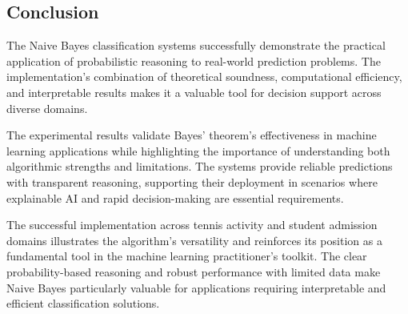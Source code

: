 \documentclass[11pt,a4paper]{article}
\begin{document}
\subsection{Conclusion}

The Naive Bayes classification systems successfully demonstrate the practical application of probabilistic reasoning to real-world prediction problems. The implementation's combination of theoretical soundness, computational efficiency, and interpretable results makes it a valuable tool for decision support across diverse domains.

The experimental results validate Bayes' theorem's effectiveness in machine learning applications while highlighting the importance of understanding both algorithmic strengths and limitations. The systems provide reliable predictions with transparent reasoning, supporting their deployment in scenarios where explainable AI and rapid decision-making are essential requirements.

The successful implementation across tennis activity and student admission domains illustrates the algorithm's versatility and reinforces its position as a fundamental tool in the machine learning practitioner's toolkit. The clear probability-based reasoning and robust performance with limited data make Naive Bayes particularly valuable for applications requiring interpretable and efficient classification solutions.
\end{document}
